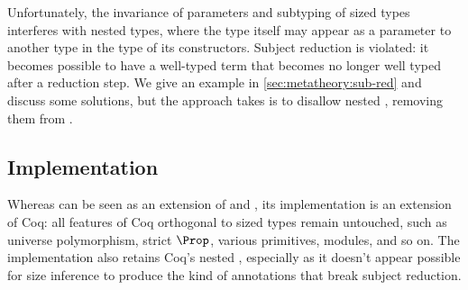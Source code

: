 Unfortunately, the invariance of parameters and subtyping of sized \coinductive types interferes with nested \coinductive types,
where the type itself may appear as a parameter to another type in the type of its constructors.
Subject reduction is violated: it becomes possible to have a well-typed term that becomes no longer well typed after a reduction step.
We give an example in \autoref{sec:metatheory:sub-red} and discuss some solutions,
but the approach \lang takes is to disallow nested \coinductives,
removing them from \CIChat.

\iffalse
\subsection{Position Size Annotations}

Although users aren't required to indicate the recursive argument when writing fixpoints in Coq,
they are indicated in the core calculus because Coq's type checker will attempt to determine which one it is when not explicitly indicated.
This tells the guard predicate which argument should be checked for structural smallerness.
Similarly, \lang has position annotations to indicate which argument is the recursive argument and whether the \cofixpoint preserves sizes or not,
but they are entirely determined during size inference.
This augments the inference algorithm for \CIChat,
which assumes that the annotations are already present.

Note that while inference begins with terms whose position annotations are absent,
we do assume that the recursive arguments are already indicated,
separating what Coq already does from what there is to do to obtain sized types.
In terms of the implementation, one downside of this approach is that not as many programs that \emph{could} pass type checking \emph{do},
due to the existing architecture of the Coq type checker.
We discuss this further in \autoref{sec:impl:recind}.
\fi

\subsection{Implementation}

Whereas \lang can be seen as an extension of \CIChat and \CChatomega,
its implementation is an extension of Coq:
all features of Coq orthogonal to sized types remain untouched,
such as universe polymorphism, strict $\Prop$, various primitives, modules, and so on.
The implementation also retains Coq's nested \coinductives,
especially as it doesn't appear possible for size inference to produce the kind of annotations that break subject reduction.

